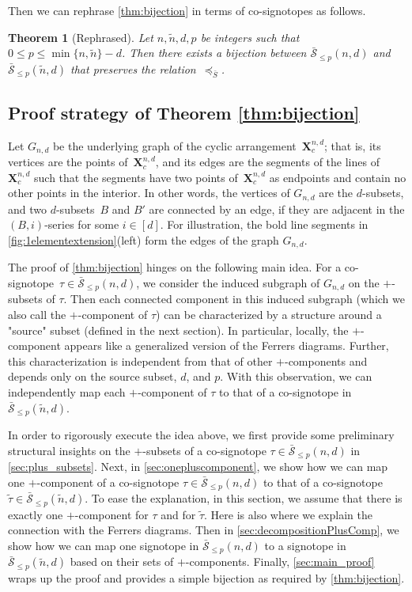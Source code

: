 \documentclass[a4paper,11pt]{amsart}
\newtheorem{theorem}{Theorem}
\newcommand{\calS}{\mathcal{S}}
\newcommand{\tn}{\tilde{n}}
\begin{document}
Then we can rephrase \cref{thm:bijection} in terms of co-signotopes as follows.

\begingroup
\def\thetheorem{\ref{thm:bijection}}
\begin{theorem}[Rephrased]
    Let $n, \tilde{n}, d, p$ be integers such that $0\leq p \leq \min\{n,\tn\}-d$.
    Then there exists a bijection between $\bar{\calS}_{\leq p}(n,d)$ and $\bar{\calS}_{\leq p}(\tn,d)$ that preserves the relation~$\preceq_{\bar{S}}$.
\end{theorem}
\addtocounter{theorem}{-1}
\endgroup

\subsection{Proof strategy of Theorem \ref{thm:bijection}}
\label{subsec:proof_outline}
Let $G_{n,d}$ be the underlying graph of the cyclic arrangement~$\mathbf{X}^{n,d}_c$; that is, its vertices are the points of~$\mathbf{X}^{n,d}_c$, and its edges are the segments of the lines of~$\mathbf{X}^{n,d}_c$ such that the segments have two points of~$\mathbf{X}^{n,d}_c$ as endpoints and contain no other points in the interior.
In other words, the vertices of $G_{n,d}$ are the $d$-subsets, and two $d$-subsets~$B$ and $B'$ are connected by an edge, if they are adjacent in the $(B,i)$-series for some $i \in [d]$.
For illustration, the bold line segments in \cref{fig:1elementextension}(left) form the edges of the graph $G_{n,d}$.

The proof of \cref{thm:bijection} hinges on the following main idea.
For a co-signotope~$\tau \in \bar{\calS}_{\leq p}(n,d)$, we consider the induced subgraph of $G_{n,d}$ on the $+$-subsets of $\tau$.
Then each connected component in this induced subgraph (which we also call the $+$-component of $\tau$) can be characterized by a structure around a "source" subset (defined in the next section).
In particular, locally, the $+$-component appears like a generalized version of the Ferrers diagrams.
Further, this characterization is independent from that of other $+$-components and depends only on the source subset, $d$, and $p$.
With this observation, we can independently map each $+$-component of $\tau$ to that of a co-signotope in $\bar{\calS}_{\leq p}(\tn,d)$.

In order to rigorously execute the idea above, we first provide some preliminary structural insights on the $+$-subsets of a co-signotope $\tau \in \bar{\calS}_{\leq p}(n,d)$ in \cref{sec:plus_subsets}.
Next, in \cref{sec:onepluscomponent}, we show how we can map one $+$-component of a co-signotope $\tau \in \bar{\calS}_{\leq p}(n,d)$ to that of a co-signotope $\tilde{\tau} \in \bar{\calS}_{\leq p}(\tn,d)$.
To ease the explanation, in this section, we assume that there is exactly one $+$-component for $\tau$ and for $\tilde{\tau}$.
Here is also where we explain the connection with the Ferrers diagrams.
Then in \cref{sec:decompositionPlusComp}, we show how we can map one signotope in $\bar{\calS}_{\leq p}(n,d)$ to a signotope in $\bar{\calS}_{\leq p}(\tn,d)$ based on their sets of $+$-components. 
Finally, \cref{sec:main_proof} wraps up the proof and provides a simple bijection as required by \cref{thm:bijection}.
\end{document}
